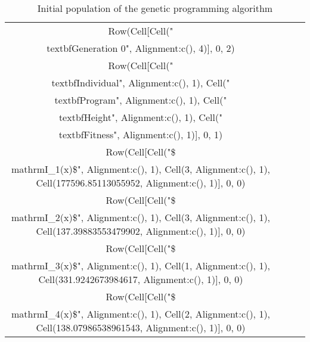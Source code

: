 \begin{table}[ht!]
  \centering
  \begin{tabular}{c|c|c|r}
    Row(Cell[Cell("\\textbf{Generation 0}", Alignment{:c}(), 4)], 0, 2)	\\
    Row(Cell[Cell("\\textbf{Individual}", Alignment{:c}(), 1), Cell("\\textbf{Program}", Alignment{:c}(), 1), Cell("\\textbf{Height}", Alignment{:c}(), 1), Cell("\\textbf{Fitness}", Alignment{:c}(), 1)], 0, 1)	\\
    Row(Cell[Cell("\$\\mathrm{I}_1(x)\$", Alignment{:c}(), 1), Cell(3, Alignment{:c}(), 1), Cell(177596.85113055952, Alignment{:c}(), 1)], 0, 0)	\\
    Row(Cell[Cell("\$\\mathrm{I}_2(x)\$", Alignment{:c}(), 1), Cell(3, Alignment{:c}(), 1), Cell(137.39883553479902, Alignment{:c}(), 1)], 0, 0)	\\
    Row(Cell[Cell("\$\\mathrm{I}_3(x)\$", Alignment{:c}(), 1), Cell(1, Alignment{:c}(), 1), Cell(331.9242673984617, Alignment{:c}(), 1)], 0, 0)	\\
    Row(Cell[Cell("\$\\mathrm{I}_4(x)\$", Alignment{:c}(), 1), Cell(2, Alignment{:c}(), 1), Cell(138.07986538961543, Alignment{:c}(), 1)], 0, 0)	\\
  \end{tabular}
  \caption{Initial population of the genetic programming algorithm}
  \label{tab:bg:gp:sym:init:pop}
\end{table}